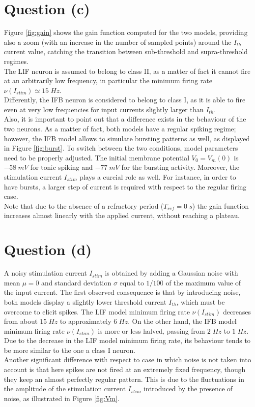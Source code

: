 \documentclass[11pt]{article}
\begin{document}
\section*{Question (c)}
Figure \ref{fig:gain} shows the gain function computed for the two models,
providing also a zoom (with an increase in the number of sampled points)
around the \(I_{th}\) current value, catching the transition between
sub-threshold and supra-threshold regimes.\\
The LIF neuron is assumed to belong to class II, as a matter of fact 
it cannot fire at an arbitrarily low frequency, in particular the minimum
firing rate \(\nu(I_{stim})\simeq{15}\;Hz\).\\
Differently, the IFB neuron is considered to belong to class I, as it is able to fire
even at very low frequencies for input currents slightly larger than \(I_{th}\).\\
Also, it is important to point out that a difference exists in the behaviour of the
two neurons. As a matter of fact, both models have a regular spiking regime; however,
the IFB model allows to simulate bursting patterns as well, as displayed in Figure
\ref{fig:burst}. To switch between the two conditions, model parameters need to be
properly adjusted. The initial membrane potential \(V_{0}=V_{m}(0)\) is \(-58\;mV\) for tonic 
spiking and \(-77\;mV\) for the bursting activity. Moreover, the stimulation current
\(I_{stim}\) plays a curcial role as well. For instance, in order to have bursts, a larger
step of current is required with respect to the regular firing case.\\
Note that due to the absence of a refractory period (\(T_{ref}=0\;s\)) the gain function
increases almost linearly with the applied current, without reaching a plateau.

\section*{Question (d)}
A noisy stimulation current \(I_{stim}\) is obtained by adding a Gaussian noise with
mean \(\mu=0\) and standard deviation \(\sigma\) equal to \(1/100\) of the maximum value
of the input current. The first observed consequence is that by introducing noise, both
models display a slightly lower threshold current \(I_{th}\), which must be overcome
to elicit spikes. The LIF model minimum firing rate \(\nu(I_{stim})\) decreases from
about \(15\;Hz\) to approximately \(6\;Hz\). On the other hand, the IFB model minimum firing
rate \(\nu(I_{stim})\) is more or less halved, passing from \(2\;Hz\) to \(1\;Hz\).\\
Due to the decrease in the LIF model minimum firing rate, its behaviour
tends to be more similar to the one a class I neuron.\\
Another significant difference with respect to case in which noise is not taken
into account is that here spikes are not fired at an extremely fixed frequency, though
they keep an almost perfectly regular pattern. This is due to the 
fluctuations in the amplitude of the stimulation current \(I_{stim}\) introduced by
the presence of noise, as illustrated in Figure \ref{fig:Vm}.
\end{document}
